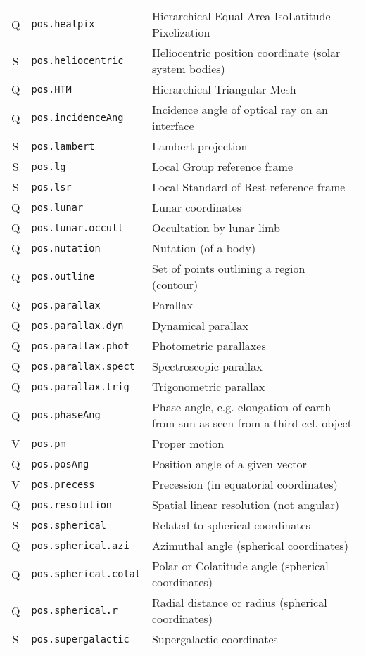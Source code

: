 \documentclass[11pt,a4paper]{ivoa}
\begin{document}
\begin{longtable}[h!]{c|p{40ex}|p{}}
Q & {\tt pos.healpix} & Hierarchical Equal Area IsoLatitude Pixelization\\
S & {\tt pos.heliocentric} & Heliocentric position coordinate (solar system bodies)\\
Q & {\tt pos.HTM} & Hierarchical Triangular Mesh\\
Q & {\tt pos.incidenceAng} & Incidence angle of optical ray on an interface\\
S & {\tt pos.lambert} & Lambert projection\\
S & {\tt pos.lg} & Local Group reference frame\\
S & {\tt pos.lsr} & Local Standard of Rest reference frame\\
Q & {\tt pos.lunar} & Lunar coordinates\\
Q & {\tt pos.lunar.occult} & Occultation by lunar limb\\
Q & {\tt pos.nutation} & Nutation (of a body)\\
Q & {\tt pos.outline} & Set of points outlining a region (contour)\\
Q & {\tt pos.parallax} & Parallax\\
Q & {\tt pos.parallax.dyn} & Dynamical parallax\\
Q & {\tt pos.parallax.phot} & Photometric parallaxes\\
Q & {\tt pos.parallax.spect} & Spectroscopic parallax\\
Q & {\tt pos.parallax.trig} & Trigonometric parallax\\
Q & {\tt pos.phaseAng} & Phase angle, e.g. elongation of earth from sun as seen from a third cel. object\\
V & {\tt pos.pm} & Proper motion\\
Q & {\tt pos.posAng} & Position angle of a given vector\\
V & {\tt pos.precess} & Precession (in equatorial coordinates)\\
Q & {\tt pos.resolution} & Spatial linear resolution (not angular)\\
S & {\tt pos.spherical} & Related to spherical coordinates\\
Q & {\tt pos.spherical.azi} & Azimuthal angle (spherical coordinates)\\
Q & {\tt pos.spherical.colat} & Polar or Colatitude angle (spherical coordinates)\\
Q & {\tt pos.spherical.r} & Radial distance or radius (spherical coordinates)\\
S & {\tt pos.supergalactic} & Supergalactic coordinates\\

\end{longtable}
\end{document}
